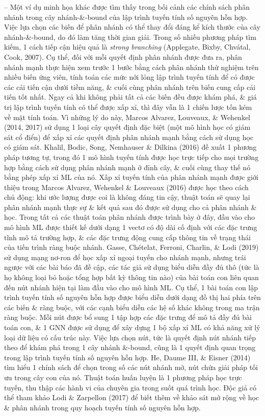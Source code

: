 \documentclass{article}
\begin{document}
\begin{itemize}
\begin{itemize}
\begin{itemize}
            -- Một ví dụ minh họa khác được tìm thấy trong bối cảnh các chính sách phân nhánh trong cây nhánh-\&-bound của lập trình tuyến tính số nguyên hỗn hợp. Việc lựa chọn các biến để phân nhánh có thể thay đổi đáng kể kích thước của cây nhánh-\&-bound, do đó làm tăng thời gian giải. Trong số nhiều phương pháp tìm kiếm, 1 cách tiếp cận hiệu quả là {\it strong branching} (Applegate, Bixby, Chvátal, Cook, 2007). Cụ thể, đối với mỗi quyết định phân nhánh được đưa ra, phân nhánh mạnh thực hiện xem trước 1 bước bằng cách phân nhánh thử nghiệm trên nhiều biến ứng viên, tính toán các mức nới lỏng lập trình tuyến tính để có được các cải tiến cận dưới tiềm năng, \& cuối cùng phân nhánh trên biến cung cấp cải tiến tốt nhất. Ngay cả khi không phải tất cả các biến đều được khám phá, \& giá trị lập trình tuyến tính có thể được xấp xỉ, thì đây vẫn là 1 chiến lược tốn kém về mặt tính toán. Vì những lý do này, Marcos Alvarez, Louveaux, \& Wehenkel (2014, 2017) sử dụng 1 loại cây quyết định đặc biệt (một mô hình học có giám sát cổ điển) để xấp xỉ các quyết định phân nhánh mạnh bằng cách sử dụng học có giám sát. Khalil, Bodic, Song, Nemhauser \& Dilkina (2016) đề xuất 1 phương pháp tương tự, trong đó 1 mô hình tuyến tính được học trực tiếp cho mọi trường hợp bằng cách sử dụng phân nhánh mạnh ở đỉnh cây, \& cuối cùng thay thế nó bằng phép xấp xỉ ML của nó. Xấp xỉ tuyến tính của phân nhánh mạnh được giới thiệu trong Marcos Alvarez, Wehenkel \& Louveaux (2016) được học theo cách chủ động: khi ước lượng được coi là không đáng tin cậy, thuật toán sẽ quay lại phân nhánh mạnh thực sự \& kết quả sau đó được sử dụng cho cả phân nhánh \& học. Trong tất cả các thuật toán phân nhánh được trình bày ở đây, đầu vào cho mô hình ML được thiết kế dưới dạng 1 vectơ có độ dài cố định với các đặc trưng tĩnh mô tả trường hợp, \& các đặc trưng động cung cấp thông tin về trạng thái của tiến trình ràng buộc nhánh. Gasse, Chételat, Ferroni, Charlin, \& Lodi (2019) sử dụng mạng nơ-ron để học xấp xỉ ngoại tuyến cho nhánh mạnh, nhưng trái ngược với các bài báo đã đề cập, các tác giả sử dụng biểu diễn đầy đủ thô (tức là họ không loại bỏ hoặc tổng hợp bất kỳ thông tin nào) của bài toán con liên quan đến nút nhánh hiện tại làm đầu vào cho mô hình ML. Cụ thể, 1 bài toán con lập trình tuyến tính số nguyên hỗn hợp được biểu diễn dưới dạng đồ thị hai phía trên các biến \& ràng buộc, với các cạnh biểu diễn các hệ số khác không trong ma trận ràng buộc. Mỗi nút được bổ sung 1 tập hợp các đặc trưng để mô tả đầy đủ bài toán con, \& 1 GNN được sử dụng để xây dựng 1 bộ xấp xỉ ML có khả năng xử lý loại dữ liệu có cấu trúc này. Việc lựa chọn nút, tức là quyết định nút nhánh tiếp theo để khám phá trong 1 cây nhánh \&-bound, cũng là 1 quyết định quan trọng trong lập trình tuyến tính số nguyên hỗn hợp. He, Daume III, \& Eisner (2014) tìm hiểu 1 chính sách để chọn trong số các nút nhánh mở, nút chứa giải pháp tối ưu trong cây con của nó. Thuật toán huấn luyện là 1 phương pháp học trực tuyến, thu thập các hành vi của chuyên gia trong suốt quá trình học. Độc giả có thể tham khảo Lodi \& Zarpellon (2017) để biết thêm về khảo sát mở rộng về học \& phân nhánh trong quy hoạch tuyến tính số nguyên hỗn hợp.


\end{itemize}
\end{itemize}
\end{itemize}
\end{document}
